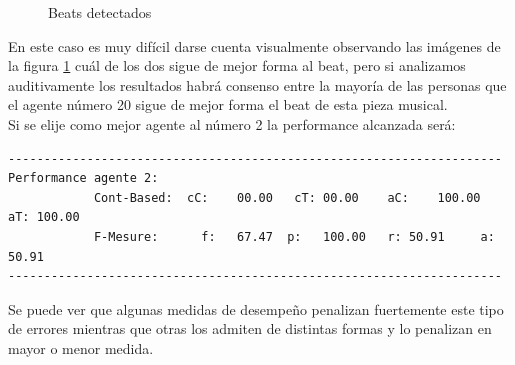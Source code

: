\documentclass[12pt,a4paper,titlepage]{report}
\begin{document}
\begin{figure} [h!]
\centering
  \caption{Beats detectados}
  \label{fig:datos_2_14_A_beats}
\end{figure}

En este caso es muy difícil darse cuenta visualmente observando las imágenes de la figura \ref{fig:datos_2_14_A_beats} cuál de los dos sigue de mejor forma al beat, pero si analizamos auditivamente los resultados habrá consenso entre la mayoría de las personas que el agente número 20 sigue de mejor forma el beat de esta pieza musical.\\

Si se elije como mejor agente al número 2 la performance alcanzada será:
\begin{verbatim}
---------------------------------------------------------------------
Performance agente 2:
        	Cont-Based:	 cC:	00.00	cT:	00.00	 aC:	100.00	aT:	100.00
        	F-Mesure: 	   f:	67.47  p:	100.00	 r:	50.91	  a:	50.91
---------------------------------------------------------------------
\end{verbatim}
Se puede ver que algunas medidas de desempeño penalizan fuertemente este tipo de errores mientras que otras los admiten de distintas formas y lo penalizan en mayor o menor medida.\\
\end{document}
